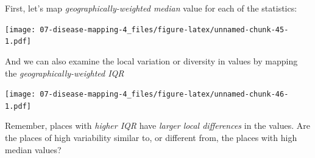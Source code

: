 \documentclass[
]{book}
\newenvironment{Shaded}{\begin{snugshade}}{\end{snugshade}}
\newcommand{\AttributeTok}[1]{\textcolor[rgb]{0.13,0.29,0.53}{#1}}
\newcommand{\CommentTok}[1]{\textcolor[rgb]{0.56,0.35,0.01}{\textit{#1}}}
\newcommand{\FunctionTok}[1]{\textcolor[rgb]{0.13,0.29,0.53}{\textbf{#1}}}
\newcommand{\NormalTok}[1]{#1}
\newcommand{\SpecialCharTok}[1]{\textcolor[rgb]{0.81,0.36,0.00}{\textbf{#1}}}
\newcommand{\StringTok}[1]{\textcolor[rgb]{0.31,0.60,0.02}{#1}}
\begin{document}
First, let's map \emph{geographically-weighted median} value for each of the statistics:

\begin{Shaded}
\end{Shaded}

\texttt{[image: 07-disease-mapping-4\_files/figure-latex/unnamed-chunk-45-1.pdf]}

And we can also examine the local variation or diversity in values by mapping the \emph{geographically-weighted IQR}

\begin{Shaded}
\end{Shaded}

\texttt{[image: 07-disease-mapping-4\_files/figure-latex/unnamed-chunk-46-1.pdf]}

Remember, places with \emph{higher IQR} have \emph{larger local differences} in the values. Are the places of high variability similar to, or different from, the places with high median values?
\end{document}
